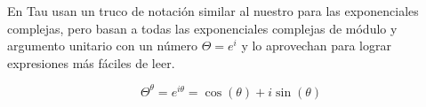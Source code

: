 \documentclass[preview]{standalone}
\begin{document}
\begin{center}
En Tau usan un truco de notación similar al nuestro para las exponenciales complejas, pero basan a todas las
exponenciales complejas de módulo y argumento unitario con un número $\Theta=e^i$ y lo aprovechan para lograr 
expresiones más fáciles de leer. 

$$\Theta^{\theta}=e^{i\theta} = \cos(\theta) + i\sin(\theta)$$
\end{center}
\end{document}
